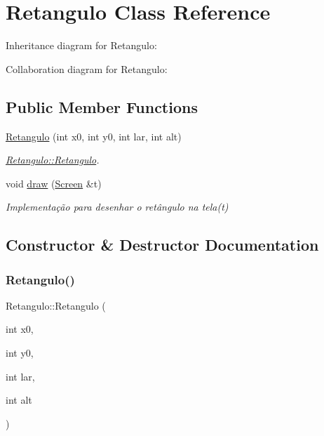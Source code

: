 \hypertarget{classRetangulo}{}\section{Retangulo Class Reference}
\label{classRetangulo}


Inheritance diagram for Retangulo\+:


Collaboration diagram for Retangulo\+:
\subsection*{Public Member Functions}
\begin{DoxyCompactItemize}
\item 
\hyperlink{classRetangulo_a7fe5e7fb3238714f7f08ec10f70706a9}{Retangulo} (int x0, int y0, int lar, int alt)
\begin{DoxyCompactList}\small\item\em \hyperlink{classRetangulo_a7fe5e7fb3238714f7f08ec10f70706a9}{Retangulo\+::\+Retangulo}. \end{DoxyCompactList}\item 
void \hyperlink{classRetangulo_ac088dd6d3f4f3d3f80363a868c2e74f1}{draw} (\hyperlink{classScreen}{Screen} \&t)
\begin{DoxyCompactList}\small\item\em Implementação para desenhar o retângulo na tela(t) \end{DoxyCompactList}\end{DoxyCompactItemize}


\subsection{Constructor \& Destructor Documentation}
\mbox{\label{classRetangulo_a7fe5e7fb3238714f7f08ec10f70706a9}} 
\subsubsection{\texorpdfstring{Retangulo()}{Retangulo()}}
{\footnotesize\ttfamily Retangulo\+::\+Retangulo (\begin{DoxyParamCaption}\item[{int}]{x0,  }\item[{int}]{y0,  }\item[{int}]{lar,  }\item[{int}]{alt }\end{DoxyParamCaption})}



